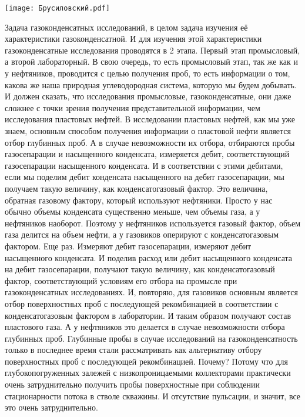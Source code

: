 \documentclass[main.tex]{subfiles}
\begin{document}
\begin{center}
\texttt{[image: Брусиловский.pdf]}
\end{center}

Задача газоконденсатных исследований, в целом задача изучения её характеристики газоконденсатной.
И для изучения этой характеристики газоконденсатные исследования проводятся в 2 этапа.
Первый этап промысловый, а второй лабораторный.
В свою очередь, то есть промысловый этап, так же как и у нефтяников, проводится с целью получения проб, то есть информации о том, какова же наша природная углеводородная система, которую мы будем добывать.
И должен сказать, что исследования промысловые, газоконденсатные, они даже сложнее с точки зрения получения представительной информации, чем исследования пластовых нефтей.
В исследовании пластовых нефтей, как мы уже знаем, основным способом получения информации о пластовой нефти является отбор глубинных проб.
А в случае невозможности их отбора, отбираются пробы газосепарации и насыщенного конденсата, измеряется дебит, соответствующий газосепарации насыщенного конденсата.
И в соответствии с этими дебитами, если мы поделим дебит конденсата насыщенного на дебит газосепарации, мы получаем такую величину, как конденсатогазовый фактор.
Это величина, обратная газовому фактору, который используют нефтяники.
Просто у нас обычно объемы конденсата существенно меньше, чем объемы газа, а у нефтяников наоборот.
Поэтому у нефтяников используется газовый фактор, объем газа делится на объем нефти, а у газовиков оперируют с конденсатогазовым фактором.
Еще раз.
Измеряют дебит газосепарации, измеряют дебит насыщенного конденсата.
И поделив расход или дебит насыщенного конденсата на дебит газосепарации, получают такую величину, как конденсатогазовый фактор, соответствующий условиям его отбора на промысле при газоконденсатных исследованиях.
И, повторяю, для газовиков основным является отбор поверхностных проб с последующей рекомбинацией в соответствии с конденсатогазовым фактором в лаборатории.
И таким образом получают состав пластового газа.
А у нефтяников это делается в случае невозможности отбора глубинных проб.
Глубинные пробы в случае исследований на газоконденсатность только в последнее время стали рассматривать как альтернативу отбору поверхностных проб с последующей рекомбинацией.
Почему?
Потому что для глубокопогруженных залежей с низкопроницаемыми коллекторами практически очень затруднительно получить пробы поверхностные при соблюдении стационарности потока в стволе скважины.
И отсутствие пульсации, и значит, все это очень затруднительно.
\end{document}
